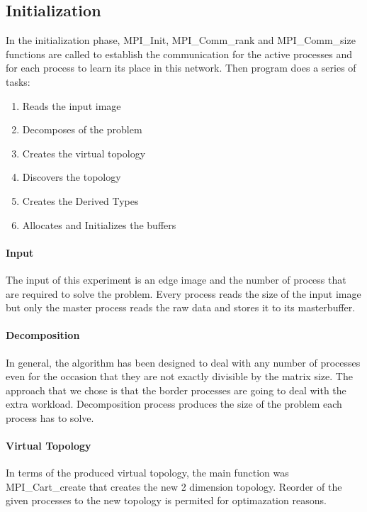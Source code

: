 \documentclass[12pt,a4paper]{article}
\begin{document}
    \subsection{Initialization}
        In the initialization phase, MPI\_Init, MPI\_Comm\_rank and MPI\_Comm\_size functions are called to establish the communication for the active processes and for each process to learn its place in this network. Then program does a series of tasks:

        \begin{enumerate}
          \item Reads the input image
          \item Decomposes of the problem
          \item Creates the virtual topology
          \item Discovers the topology
          \item Creates the Derived Types
          \item Allocates and Initializes the buffers
        \end{enumerate}

        \paragraph{Input}
			The input of this experiment is an edge image and the number of process that are required to solve the problem. Every process reads the size of the input image but only the master process reads the raw data and stores it to its masterbuffer.

        \paragraph{Decomposition}
        	In general, the algorithm has been designed to deal with any number of processes even for the occasion that they are not exactly divisible by the matrix size. The approach that we chose is that the border processes are going to deal with the extra workload. Decomposition process produces the size of the problem each process has to solve.

        \paragraph{Virtual Topology}
            In terms of the produced virtual topology, the main function was MPI\_Cart\_create that creates the new 2 dimension topology. Reorder of the given processes to the new topology is permited for optimazation reasons.
\end{document}
